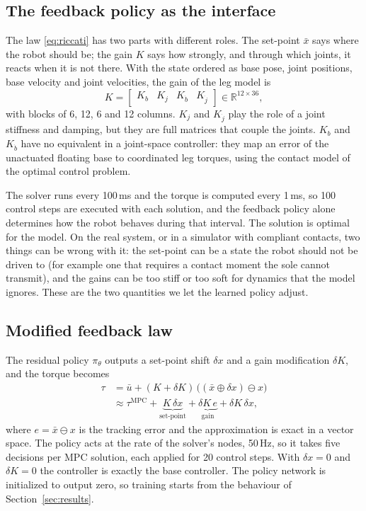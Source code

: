 \documentclass[conference]{IEEEtran}
\newcommand{\R}{\mathbb{R}}
\newcommand{\mpc}{\mathrm{MPC}}
\newcommand{\xb}{\bar{x}}
\newcommand{\ub}{\bar{u}}
\begin{document}
\subsection{The feedback policy as the interface}
The law \eqref{eq:riccati} has two parts with different roles.
The set-point $\xb$ says where the robot should be; the gain $K$ says how strongly, and through which joints, it reacts when it is not there.
With the state ordered as base pose, joint positions, base velocity and joint velocities, the gain of the leg model is
\begin{equation}
K=\begin{bmatrix}K_{b}&K_{j}&K_{\dot b}&K_{\dot j}\end{bmatrix}\in\R^{12\times36},
\label{eq:kpart}
\end{equation}
with blocks of 6, 12, 6 and 12 columns.
$K_j$ and $K_{\dot j}$ play the role of a joint stiffness and damping, but they are full matrices that couple the joints.
$K_b$ and $K_{\dot b}$ have no equivalent in a joint-space controller: they map an error of the unactuated floating base to coordinated leg torques, using the contact model of the optimal control problem.

The solver runs every 100\,ms and the torque is computed every 1\,ms, so 100 control steps are executed with each solution, and the feedback policy alone determines how the robot behaves during that interval.
The solution is optimal for the model.
On the real system, or in a simulator with compliant contacts, two things can be wrong with it: the set-point can be a state the robot should not be driven to (for example one that requires a contact moment the sole cannot transmit), and the gains can be too stiff or too soft for dynamics that the model ignores.
These are the two quantities we let the learned policy adjust.

\subsection{Modified feedback law}
The residual policy $\pi_\theta$ outputs a set-point shift $\delta x$ and a gain modification $\delta K$, and the torque becomes
\begin{align}
\tau&=\ub+(K+\delta K)\,\big((\xb\oplus\delta x)\ominus x\big)\nonumber\\
&\approx\tau^{\mpc}+\underbrace{K\,\delta x}_{\text{set-point}}+\underbrace{\delta K\,e}_{\text{gain}}+\delta K\,\delta x,
\label{eq:l2}
\end{align}
where $e=\xb\ominus x$ is the tracking error and the approximation is exact in a vector space.
The policy acts at the rate of the solver's nodes, 50\,Hz, so it takes five decisions per MPC solution, each applied for 20 control steps.
With $\delta x=0$ and $\delta K=0$ the controller is exactly the base controller.
The policy network is initialized to output zero, so training starts from the behaviour of Section~\ref{sec:results}.
\end{document}
